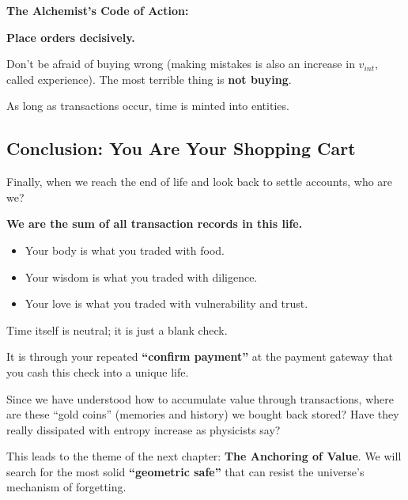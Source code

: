 \textbf{The Alchemist's Code of Action:}

\textbf{Place orders decisively.}

Don't be afraid of buying wrong (making mistakes is also an increase in $v_{int}$, called experience). The most terrible thing is \textbf{not buying}.

As long as transactions occur, time is minted into entities.

\subsection{Conclusion: You Are Your Shopping Cart}

Finally, when we reach the end of life and look back to settle accounts, who are we?

\textbf{We are the sum of all transaction records in this life.}

\begin{itemize}
\item Your body is what you traded with food.

\item Your wisdom is what you traded with diligence.

\item Your love is what you traded with vulnerability and trust.
\end{itemize}

Time itself is neutral; it is just a blank check.

It is through your repeated \textbf{``confirm payment''} at the payment gateway that you cash this check into a unique life.

Since we have understood how to accumulate value through transactions, where are these ``gold coins'' (memories and history) we bought back stored? Have they really dissipated with entropy increase as physicists say?

This leads to the theme of the next chapter: \textbf{The Anchoring of Value}. We will search for the most solid \textbf{``geometric safe''} that can resist the universe's mechanism of forgetting.

